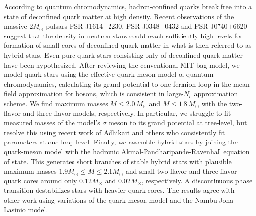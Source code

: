 According to quantum chromodynamics,
hadron-confined quarks break free into a state of deconfined quark matter at high density.
Recent observations of the massive $2 M_\odot$-pulsars PSR J1614$-$2230, PSR J0348$+$0432 and PSR J0740$+$6620
suggest that the density in neutron stars could reach sufficiently high levels
for formation of small cores of deconfined quark matter in what is then referred to as hybrid stars.
Even pure quark stars consisting only of deconfined quark matter have been hypothesized.
After reviewing the conventional MIT bag model,
we model quark stars using the effective quark-meson model of quantum chromodynamics,
calculating its grand potential to one fermion loop in the mean-field approximation for bosons,
which is consistent in large-$N_c$ approximation scheme.
We find maximum masses $M \leq 2.0 \, M_\odot$ and $M \leq 1.8 \, M_\odot$ with the two-flavor and three-flavor models, respectively.
In particular, we struggle to fit measured masses 
of the model's $\sigma$ meson to its grand potential at tree-level,
but resolve this using recent work of Adhikari and others who consistently fit parameters at one loop level.
Finally, we assemble hybrid stars by joining the quark-meson model with the hadronic Akmal-Pandharipande-Ravenhall equation of state.
This generates short branches of stable hybrid stars with plausible maximum masses $1.9 M_\odot \leq M \leq 2.1 M_\odot$
and small two-flavor and three-flavor quark cores around only $0.12 M_\odot$ and $0.02 M_\odot$, respectively.
A discontinuous phase transition destabilizes stars with heavier quark cores.
The results agree with other work using variations of the quark-meson model and the Nambu-Jona-Lasinio model.%
\tikzexternaldisable%
%
\tikzexternalenable%

